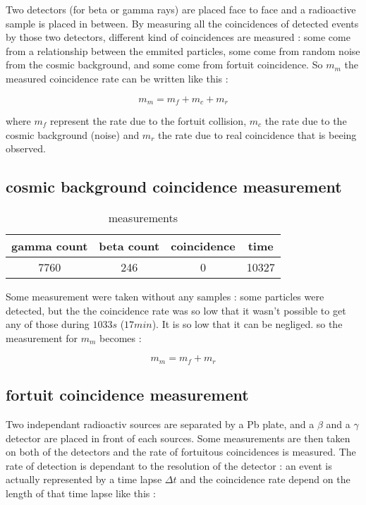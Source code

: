 \documentclass[a4paper,12pt,oneside]{article}
\def \be {\begin{equation}}
\def \ee {\end{equation}}
\begin{document}
Two detectors (for beta or gamma rays) are placed face to face and a radioactive sample is placed in between. By measuring all the coincidences of detected events by those two detectors, different kind of coincidences are measured : some come from a relationship between the emmited particles, some come from random noise from the cosmic background, and some come from fortuit coincidence. So $m_m$ the measured coincidence rate can be written like this :

\be 
	m_m = m_f + m_c + m_r
\ee 

where $m_f$ represent the rate due to the fortuit collision, $m_c$ the rate due to the cosmic background (noise) and $m_r$ the rate due to real coincidence that is beeing observed. 

\subsection{cosmic background coincidence measurement}


\begin{table}[h!]
\centering
	\begin{tabular}{|c|c|c|c|}
		\hline
			gamma count		&beta count		&coincidence	&time\\
		\hline
			7760			&246			&0				&10327\\
		\hline
	\end{tabular}
	\caption{measurements}
	\label{tab:poisson}
\end{table}


Some measurement were taken without any samples : some particles were detected, but the the coincidence rate was so low that it wasn't possible to get any of those during $1033 s$ ($17 min$). It is so low that it can be negliged. so the measurement for $m_m$ becomes :

\be 
	m_m = m_f + m_r
\ee 

\subsection{fortuit coincidence measurement}

Two independant radioactiv sources are separated by a Pb plate, and a $\beta$ and a $\gamma$ detector are placed in front of each sources. Some measurements are then taken on both of the detectors and the rate of fortuitous coincidences is measured. The rate of detection is dependant to the resolution of the detector : an event is actually represented by a time lapse $\Delta t$ and the coincidence rate depend on the length of that time lapse like this :
\end{document}
